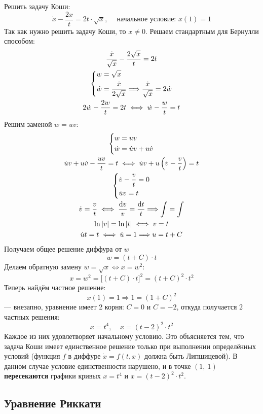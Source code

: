\documentclass[a4paper,12pt]{article}
\renewcommand*\d{\mathop{}\!\mathrm{d}}
\newcommand{\dw}{\dot{w}}
\newcommand{\du}{\dot{u}}
\renewcommand{\dv}{\dot{v}}
\newcommand{\dx}{\dot{x}}
\newcommand{\ds}{\displaystyle}
\begin{document}
Решить задачу Коши:
\[\dx - \dfrac{2x}{t} = 2t\cdot \sqrt{x},\ \ \ \ \text{ начальное условие: } x(1) = 1\]
Так как нужно решить задачу Коши, то $x \neq 0$. Решаем стандартным для Бернулли способом:
\begin{gather*}
\dfrac{\dx}{\sqrt{x}} - \dfrac{2\sqrt{x}}{t} = 2t\\
\left\{\begin{gathered}
w = \sqrt{x}\hfill\\
\dw = \dfrac{\dx}{2\sqrt{x}} \Longrightarrow \dfrac{\dx}{\sqrt{x}} = 2\dw\hfill
\end{gathered}\right.\\
2\dw - \dfrac{2w}{t} = 2t \iff \dw - \dfrac{w}{t} = t
\end{gather*}
Решим заменой $w = uv$:
\begin{gather*}
	\left\{\begin{gathered}
	w = uv\hfill\\
	\dw = \du v + u\dv\hfill
	\end{gathered}\right.\\
	\du v + u\dv - \dfrac{uv}{t} = t \iff \du v + u\left(\dv - \dfrac{v}{t}\right) = t\\
	\left\{\begin{gathered}
	\dv - \dfrac{v}{t} = 0\hfill\\
	\du v = t\hfill
	\end{gathered}\right.\\
	\dv = \dfrac{v}{t} \iff \dfrac{\d v}{v} = \dfrac{\d t}{t} \Longrightarrow \ds\int = \int\\
	\ln|v| = \ln|t| \iff v = t\\
	\du t = t \iff \du = 1 \Longrightarrow u = t + C
\end{gather*}
Получаем общее решение диффура от $w$
\[w = (t + C)\cdot t\]
Делаем обратную замену $w = \sqrt{x} \iff x = w^2$:
\[x = w^2 = \big[(t + C)\cdot t\big]^2 = (t + C)^2 \cdot t^2\]
Теперь найдём частное решение:
\[x(1) = 1 \Longrightarrow 1 = (1 + C)^2\] --- внезапно, уравнение имеет 2 корня: $C = 0$ и $C = -2$, откуда получается 2 частных решения:
\[x = t^4,\ \ \ \ \ x = (t - 2)^2 \cdot t^2\]
Каждое из них удовлетворяет начальному условию. Это объясняется тем, что задача Коши имеет единственное решение только при выполнении определённых условий (функция $f$ в диффуре $\dx = f(t, x)$ должна быть Липшицевой). В данном случае условие единственности нарушено, и в точке $(1,\ 1)$ \textbf{пересекаются} графики кривых $x = t^4$ и $x = (t - 2)^2 \cdot t^2$.

\subsection{Уравнение Риккати}
\end{document}
